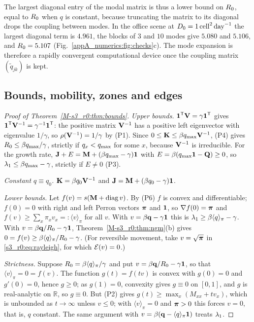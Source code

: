 The largest diagonal entry of the modal matrix is thus a lower bound on $R_0$, equal to $R_0$ when $q$ is constant,
because truncating the matrix to its diagonal drops the coupling between modes. In the office scene at
$D_0=1\,\mathrm{cell}^2\,\mathrm{day}^{-1}$ the largest diagonal term is $4.961$, the blocks of $3$ and $10$ modes give $5.080$ and $5.106$, and
$R_0=5.107$ (Fig.~\ref{appA_numerics:fig:checks}c).
The mode expansion is therefore a rapidly convergent computational device once the coupling matrix
$(\tilde q_{jk})$ is kept.

\subsection{Bounds, mobility, zones and edges}

\begin{proof}[Proof of Theorem~\ref{M-s3_r0:thm:bounds}]
  \emph{Upper bounds.}  $\boldsymbol{1}^{\mathsf{T}}\mathbf{V}=\gamma\boldsymbol{1}^{\mathsf{T}}$ gives $\boldsymbol{1}^{\mathsf{T}}\mathbf{V}^{-1}=\gamma^{-1}\boldsymbol{1}^{\mathsf{T}}$: the
  positive matrix $\mathbf{V}^{-1}$ has a positive left eigenvector with eigenvalue $1/\gamma$, so
  $\rho(\mathbf{V}^{-1})=1/\gamma$ by (P1).  Since $0\le\mathbf{K}\le\beta q_{\max}\mathbf{V}^{-1}$, (P4) gives
  $R_0\le\beta q_{\max}/\gamma$, strictly if $q_x<q_{\max}$ for some $x$, because $\mathbf{V}^{-1}$ is irreducible.  For the
  growth rate, $\mathbf{J}+E=\mathbf{M}+(\beta q_{\max}-\gamma)\mathbf{1}$ with $E=\beta(q_{\max}\mathbf{1}-\mathbf{Q})\ge0$, so
  $\lambda_1\le\beta q_{\max}-\gamma$, strictly if $E\ne0$ (P3).

  \emph{Constant $q\equiv q_0$.}  $\mathbf{K}=\beta q_0\mathbf{V}^{-1}$ and $\mathbf{J}=\mathbf{M}+(\beta q_0-\gamma)\mathbf{1}$.

  \emph{Lower bounds.}  Let $f(v)=s(\mathbf{M}+\operatorname{diag} v)$.  By (P6) $f$ is convex and differentiable; $f(0)=0$
  with right and left Perron vectors $\boldsymbol{\pi}$ and $\boldsymbol{1}$, so $\nabla f(0)=\boldsymbol{\pi}$ and
  $f(v)\ge\sum_x\pi_xv_x=:\langle v\rangle_\pi$ for all $v$.  With $v=\beta\mathbf{q}-\gamma\boldsymbol{1}$ this is
  $\lambda_1\ge\beta\langle q\rangle_{\pi}-\gamma$.  With $v=\beta\mathbf{q}/R_0-\gamma\boldsymbol{1}$, Theorem~\ref{M-s3_r0:thm:ngm}(b) gives
  $0=f(v)\ge\beta\langle q\rangle_{\pi}/R_0-\gamma$.  (For reversible movement, take $v=\sqrt{\boldsymbol{\pi}}$ in
  \eqref{s3_r0:eq:rayleigh}, for which $\mathcal{E}(v)=0$.)

  \emph{Strictness.}  Suppose $R_0=\beta\langle q\rangle_{\pi}/\gamma$ and put $v=\beta\mathbf{q}/R_0-\gamma\boldsymbol{1}$, so that
  $\langle v\rangle_\pi=0=f(v)$.  The function $g(t)=f(tv)$ is convex with $g(0)=0$ and $g'(0)=0$, hence
  $g\ge0$; as $g(1)=0$, convexity gives $g\equiv0$ on $[0,1]$, and $g$ is real-analytic on $\mathbb{R}$, so
  $g\equiv0$.  But (P2) gives $g(t)\ge\max_x(M_{xx}+tv_x)$, which is unbounded as $t\to\infty$ unless $v\le0$;
  with $\langle v\rangle_\pi=0$ and $\boldsymbol{\pi}>0$ this forces $v=0$, that is, $q$ constant.  The same argument
  with $v=\beta(\mathbf{q}-\langle q\rangle_{\pi}\boldsymbol{1})$ treats $\lambda_1$.
\end{proof}

